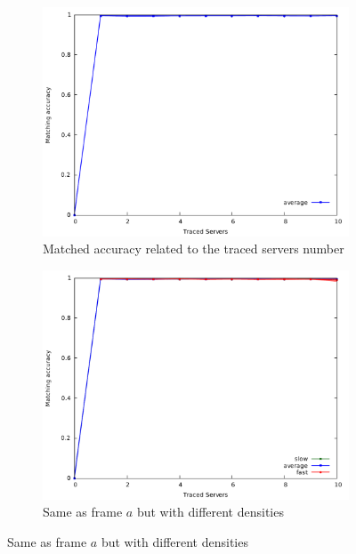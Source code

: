 \begin{figure}
\begin{subfigure}{.5\textwidth}
		\centering
		\includegraphics[width=1\linewidth]{graphs/s_server_pmatch_average_only.pdf}
		\caption{Matched accuracy related to the traced servers number}
		\label{fig:g_maccuracya}
	\end{subfigure} 
	\begin{subfigure}{.5\textwidth}
		\centering
		\includegraphics[width=1\linewidth]{graphs/s_server_pmatch.pdf}
		\caption{Same as frame $a$ but with different densities}
		\label{fig:g_maccuracyb}
	\end{subfigure}


\end{figure}
